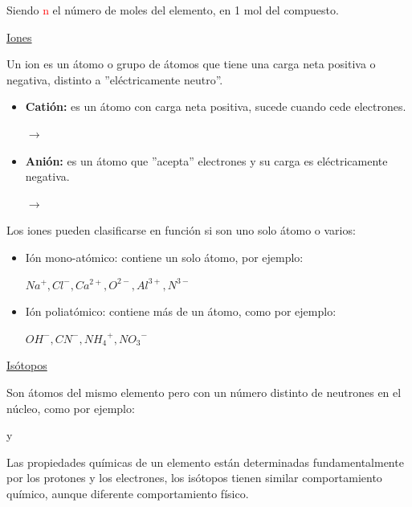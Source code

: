                 \indent Siendo \textcolor{red}{n} el número de moles del elemento, en 1 mol del compuesto.
            \begin{center} \underline{Iones} \end{center}
                \indent Un ion es un átomo o grupo de átomos que tiene una carga neta positiva o negativa, distinto a ''eléctricamente neutro''.
                \begin{itemize}
                    \item \textbf{Catión:} es un átomo con carga neta positiva, sucede cuando cede electrones.
                        \begin{center}  $\rightarrow$  \end{center}
                    \item \textbf{Anión:} es un átomo que ''acepta'' electrones y su carga es eléctricamente negativa.
                        \begin{center}  $\rightarrow$  \end{center}
                \end{itemize}
                \indent Los iones pueden clasificarse en función si son uno solo átomo o varios:
                \begin{itemize} 
                    \item Ión mono-atómico: contiene un solo átomo, por ejemplo:
                        \begin{center} ${Na^+},{Cl^-},{Ca^{2+}},{O^{2-}},{Al^{3+}},{N^{3-}}$ \end{center}
                    \item Ión poliatómico: contiene más de un átomo, como por ejemplo:
                        \begin{center} ${OH^-},{CN^-},{{NH_4}^{+}},{{NO_3}^{-}}$ \end{center}
                \end{itemize}
                \saltoPag

            \begin{center} \underline{Isótopos} \end{center}
                \indent Son átomos del mismo elemento pero con un número distinto de neutrones en el núcleo, como por ejemplo:
                \begin{center}  y  \end{center}
                \indent Las propiedades químicas de un elemento están determinadas fundamentalmente por los protones y los electrones, los isótopos tienen similar comportamiento químico, aunque diferente comportamiento físico.

